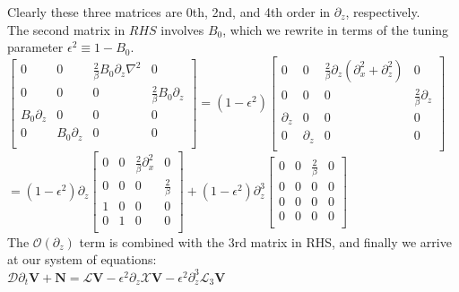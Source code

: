 \documentclass[letterpaper,12pt]{article}
\begin{document}
Clearly these three matrices are 0th, 2nd, and 4th order in $\partial_z$, respectively. \\

The second matrix in $RHS$ involves $B_0$, which we rewrite in terms of the tuning parameter $\epsilon^2 \equiv 1 - B_0$. \\

$\left[\begin{matrix}
0 & 0 & \frac{2}{\beta}B_0 \partial_z \nabla^2 & 0 \\
0 & 0 & 0 & \frac{2}{\beta} B_0 \partial_z \\
B_0 \partial_z & 0 & 0 & 0 \\
0 & B_0 \partial_z & 0 & 0 \\ \end{matrix}\right] = (1 - \epsilon^2) \left[\begin{matrix}
0 & 0 & \frac{2}{\beta}\partial_z(\partial_x^2 + \partial_z^2) & 0 \\
0 & 0 & 0 & \frac{2}{\beta}\partial_z \\
\partial_z & 0 & 0 & 0 \\
0 & \partial_z & 0 & 0 \\ \end{matrix}\right] $ \\

$ = (1 - \epsilon^2)\partial_z\left[\begin{matrix}
0 & 0 & \frac{2}{\beta}\partial_x^2 & 0 \\
0 & 0 & 0 & \frac{2}{\beta} \\
1 & 0 & 0 & 0 \\
0 & 1 & 0 & 0 \\ \end{matrix} \right] + (1 - \epsilon^2)\partial_z^3 \left[\begin{matrix}
0 & 0 & \frac{2}{\beta} & 0 \\
0 & 0 & 0 & 0 \\
0 & 0 & 0 & 0 \\
0 & 0 & 0 & 0 \\ \end{matrix} \right] $ \\

The $\mathcal{O}(\partial_z)$ term is combined with the 3rd matrix in RHS, and finally we arrive at our system of equations: \\

$\mathcal{D}\partial_t \mathbf{V} + \mathbf{N} = \mathcal{L} \mathbf{V} - \epsilon^2\partial_z\mathcal{X} \mathbf{V} - \epsilon^2 \partial_z^3 \mathcal{L}_3\mathbf{V}$ \\
\end{document}
